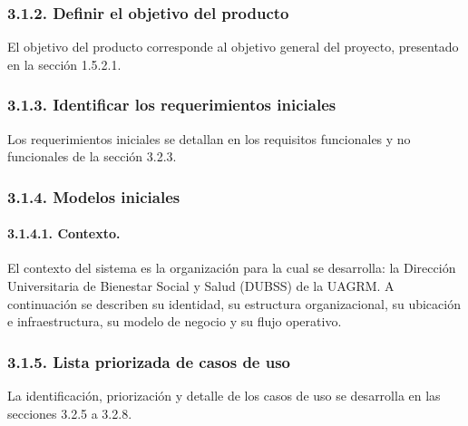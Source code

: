 \subsubsection{3.1.2. Definir el objetivo del producto}

El objetivo del producto corresponde al objetivo general del proyecto, presentado en la sección 1.5.2.1.

\subsubsection{3.1.3. Identificar los requerimientos iniciales}

Los requerimientos iniciales se detallan en los requisitos funcionales y no funcionales de la sección 3.2.3.

\subsubsection{3.1.4. Modelos iniciales}

\paragraph{3.1.4.1. Contexto.}

El contexto del sistema es la organización para la cual se desarrolla: la Dirección Universitaria de Bienestar Social y Salud (DUBSS) de la UAGRM. A continuación se describen su identidad, su estructura organizacional, su ubicación e infraestructura, su modelo de negocio y su flujo operativo.











\subsubsection{3.1.5. Lista priorizada de casos de uso}

La identificación, priorización y detalle de los casos de uso se desarrolla en las secciones 3.2.5 a 3.2.8.

